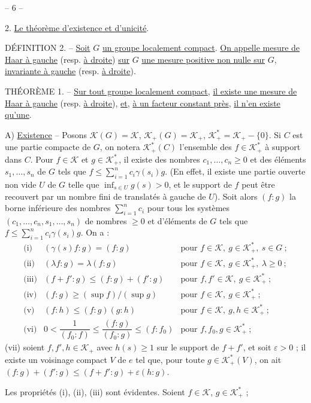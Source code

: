 \begin{center}-- 6 --\end{center}
2. \uline{Le théorème d’existence et d’unicité}.

DÉFINITION 2. -- \uline{Soit} $G$ \uline{un groupe localement compact}.
\uline{On appelle mesure de Haar à gauche} (resp. \uline{à droite})
\uline{sur} $G$ \uline{une mesure positive non nulle sur} $G$,
\uline{invariante à gauche} (resp. \uline{à droite}).

THÉORÈME 1. -- \uline{Sur tout groupe localement compact},
\uline{il existe une mesure de Haar à gauche} (resp. \uline{à droite}),
\uline{et}, \uline{à un facteur constant près}, \uline{il n’en existe qu’une}.

A) \uline{Existence} -- Posons $\mathcal K(G)=\mathcal K$,
$\mathcal K_+(G)=\mathcal K_+$, $\mathcal K_+^*=\mathcal K_+-\{0\}$.
Si $C$ est une partie compacte de $G$, on notera $\mathcal K_+^*(C)$
l’ensemble des $f\in\mathcal K_+^*$ à support dans $C$.
Pour $f\in\mathcal K$ et $g\in\mathcal K_+^*$, il existe des nombres
$c_1,\ldots,c_n\ge0$ et des éléments $s_1,\ldots,s_n$ de $G$ tels que
$f\le\sum_{i=1}^n c_i\gamma(s_i)g$.
(En effet, il existe une partie ouverte non vide $U$ de $G$ telle que
$\inf_{s\in U}g(s)>0$, et le support de $f$ peut être recouvert par un nombre
fini de translatés à gauche de $U$).
Soit alors $(f:g)$ la borne inférieure des nombres $\sum_{i=1}^n c_i$
pour tous les systèmes $(c_1,\ldots,c_n,s_1,\ldots,s_n)$ de nombres $\ge0$
et d’éléments de $G$ tels que $f\le\sum_{i=1}^n c_i\gamma(s_i)g$.
On a :
\[
\begin{array}{lll}
\text{(i)} & (\gamma(s)f:g)=(f:g) & \text{pour }f\in\mathcal K,\ g\in\mathcal K_+^*,\ s\in G\ ;\\
\text{(ii)} & (\lambda f:g)=\lambda(f:g) & \text{pour }f\in\mathcal K,\ g\in\mathcal K_+^*,\ \lambda\ge0\ ;\\
\text{(iii)} & (f+f':g)\le(f:g)+(f':g) & \text{pour }f,f'\in\mathcal K,\ g\in\mathcal K_+^*\ ;\\
\text{(iv)} & (f:g)\ge(\sup f)/(\sup g) & \text{pour }f\in\mathcal K,\ g\in\mathcal K_+^*\ ;\\
\text{(v)} & (f:h)\le(f:g)(g:h) & \text{pour }f\in\mathcal K,\ g,h\in\mathcal K_+^*\ ;\\
\text{(vi)} & 0<\dfrac1{(f_0:f)}\le\dfrac{(f:g)}{(f_0:g)}\le(f:f_0)
& \text{pour }f,f_0,g\in\mathcal K_+^*\ ;
\end{array}
\]
(vii) soient $f,f',h\in\mathcal K_+$ avec $h(s)\ge1$ sur le support de $f+f'$,
et soit $\varepsilon>0$ ; il existe un voisinage compact $V$ de $e$ tel que,
pour toute $g\in\mathcal K_+^*(V)$, on ait
$(f:g)+(f':g)\le(f+f':g)+\varepsilon(h:g)$.

Les propriétés (i), (ii), (iii) sont évidentes.
Soient $f\in\mathcal K$, $g\in\mathcal K_+^*$ ;
